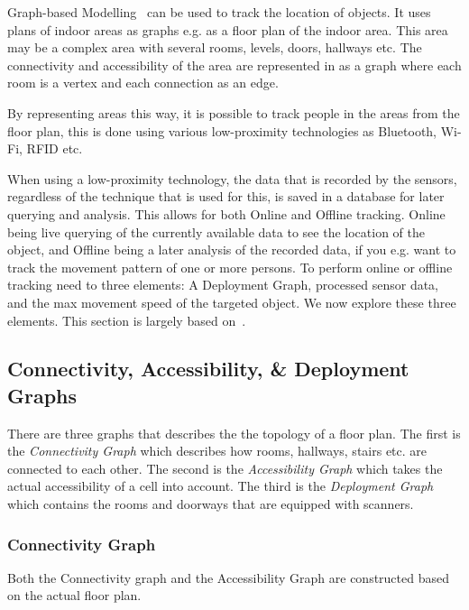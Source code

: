 Graph-based Modelling~\cite{Jensen:2009:GMB:1590953.1591000} can be used to track the location of objects. 
It uses plans of indoor areas as graphs e.g. as a floor plan of the indoor area. 
This area may be a complex area with several rooms, levels, doors, hallways etc. 
The connectivity and accessibility of the area are represented in as a graph where each room is a vertex and each connection as an edge. 

By representing areas this way, it is possible to track people in the areas from the floor plan, this is done using various low-proximity technologies as Bluetooth, Wi-Fi, RFID etc.

When using a low-proximity technology, the data that is recorded by the sensors, regardless of the technique that is used for this, is saved in a database for later querying and analysis. 
This allows for both Online and Offline tracking.
Online being live querying of the currently available data to see the location of the object, and Offline being a later analysis of the recorded data, if you e.g. want to track the movement pattern of one or more persons. 
To perform online or offline tracking need to three elements: A Deployment Graph, processed sensor data, and the max movement speed of the targeted object.
We now explore these three elements.
This section is largely based on~\cite{Jensen:2009:GMB:1590953.1591000}.


\subsection{Connectivity, Accessibility, \& Deployment Graphs}
There are three graphs that describes the the topology of a floor plan. 
The first is the \textit{Connectivity Graph} which describes how rooms, hallways, stairs etc. are connected to each other. 
The second is the \textit{Accessibility Graph} which takes the actual accessibility of a cell into account. 
The third is the \textit{Deployment Graph} which contains the rooms and doorways that are equipped with scanners.


\subsubsection{ \quad Connectivity Graph}
Both the Connectivity graph and the Accessibility Graph are constructed based on the actual floor plan. 

